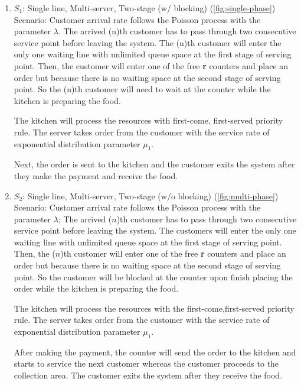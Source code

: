 \begin{enumerate}[label=\roman*)]
    \item $S_1$: Single line, Multi-server, Two-stage (w/ blocking) (\autoref{fig:single-phase}) \\
          Scenario: Customer arrival rate follows the Poisson process with the parameter $\lambda$. The arrived (n)th customer has to pass through two consecutive service point before leaving the system. The (n)th  customer will enter the only one waiting line with unlimited queue space at the first stage of serving point.
          Then, the customer will enter one of the free \textbf{r} counters and place an order but because there is no waiting space at the second stage of serving point. So the (n)th customer will need to wait at the counter while the kitchen is preparing the food.

          The kitchen will process the resources with  first-come, first-served priority rule. The server takes order from the customer with the service rate of exponential distribution parameter $\mu_1$.

          Next, the order is sent to the kitchen and the customer exits the system after they make the payment and receive the food.

    \item $S_2$: Single line, Multi-server, Two-stage (w/o blocking) (\autoref{fig:multi-phase}) \\
          Scenario: Customer arrival rate follows the Poisson process with the parameter $\lambda$; The arrived ($n$)th customer has to pass through two consecutive service point before leaving the system. The customers will enter the only one waiting line with unlimited queue space at the first stage of serving point.
          Then, the ($n$)th customer will enter one of the free \textbf{r} counters and place an order but because there is no waiting space at the second stage of serving point. So the customer will be blocked at the counter upon finish placing the order while the kitchen is preparing the food.

          The kitchen will process the resources with the first-come,first-served priority rule. The server takes order from the customer with the service rate of exponential distribution parameter $\mu_1$.

          After making the payment, the counter will send the order to the kitchen and starts to service the next customer whereas the customer proceeds to the collection area. The customer exits the system after they receive the food.
\end{enumerate}

